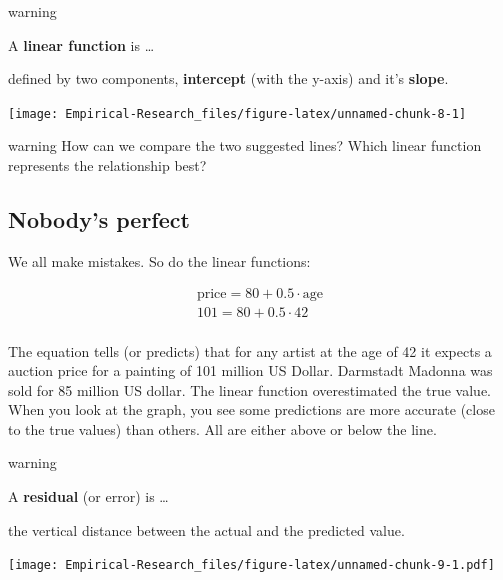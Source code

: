 \documentclass[
]{book}
\begin{document}
\begin{infobox}warning

A \textbf{linear function} is \ldots{}

defined by two components, \textbf{intercept} (with the y-axis) and it's \textbf{slope}.

\end{infobox}

\begin{center}\texttt{[image: Empirical-Research\_files/figure-latex/unnamed-chunk-8-1]} \end{center}

\begin{infobox}warning
How can we compare the two suggested lines? Which linear function represents the relationship best?

\end{infobox}

\hypertarget{nobodys-perfect}{%
\subsection{Nobody's perfect}\label{nobodys-perfect}}

We all make mistakes. So do the linear functions:

\[ \begin{align}
\text{price} = 80 + 0.5 \cdot \text{age} \tag{Suggestion 1} \\
101 = 80 + 0.5 \cdot 42 \tag{Calculation for Hohlbein} \\
\end{align}\]

The equation tells (or predicts) that for any artist at the age of 42 it expects a auction price for a painting of 101 million US Dollar. Darmstadt Madonna was sold for 85 million US dollar. The linear function overestimated the true value. When you look at the graph, you see some predictions are more accurate (close to the true values) than others. All are either above or below the line.

\begin{infobox}warning

A \textbf{residual} (or error) is \ldots{}

the vertical distance between the actual and the predicted value.

\end{infobox}

\texttt{[image: Empirical-Research\_files/figure-latex/unnamed-chunk-9-1.pdf]}
\end{document}
